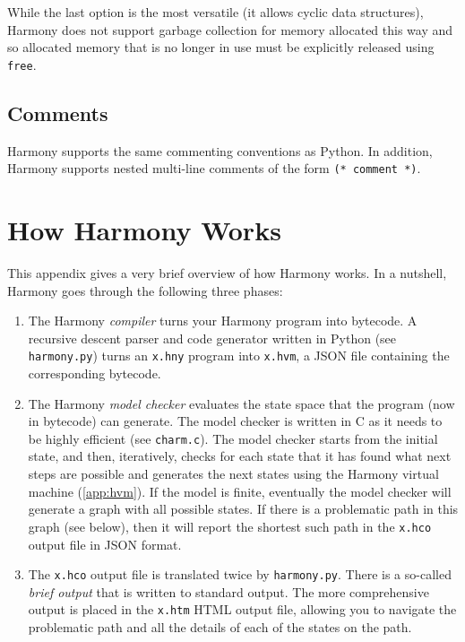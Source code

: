 \documentclass{report}
\begin{document}
While the last option is the most versatile (it allows cyclic
data structures), Harmony does not support garbage collection
for memory allocated this way and so allocated memory that is no
longer in use must be explicitly released using \texttt{free}.

\section{Comments}

Harmony supports the same commenting conventions as Python.
In addition, Harmony supports nested multi-line comments
of the form \texttt{(* comment *)}.

\chapter{How Harmony Works}\label{app:howitworks}

This appendix gives a very brief overview of how Harmony works.
In a nutshell, Harmony goes through the following three phases:

\begin{enumerate}
\item The Harmony \emph{compiler} turns your Harmony program into
bytecode.  A recursive descent parser and code generator written in
Python (see \texttt{harmony.py}) turns an \texttt{x.hny} program
into \texttt{x.hvm}, a JSON file containing the corresponding
bytecode.
\item The Harmony \emph{model checker} evaluates the state space
that the program (now in bytecode) can generate.  The model checker
is written in C as it needs to be highly efficient (see \texttt{charm.c}).
The model checker starts from the initial state, and then, iteratively,
checks for each state that it has found what next steps are possible and
generates the next states using the Harmony virtual machine
(\autoref{app:hvm}).  If the model is finite, eventually the model
checker will generate a graph with all possible states.
If there is a problematic path in this graph (see below), then it will
report the shortest such path in the \texttt{x.hco} output file in JSON
format.
\item The \texttt{x.hco} output file is translated twice by
\texttt{harmony.py}.  There is a so-called \emph{brief output} that
is written to standard output.  The more comprehensive output is placed
in the \texttt{x.htm} HTML output file, allowing you to navigate the
problematic path and all the details of each of the states on the path.
\end{enumerate}
\end{document}
